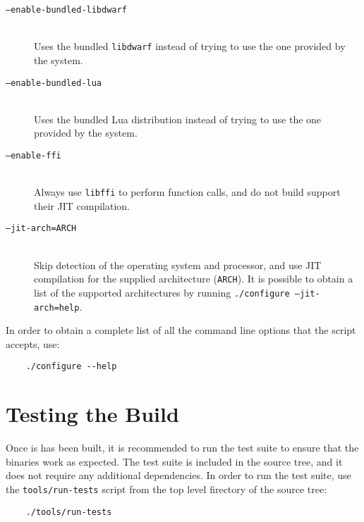 \begin{description}

	\item [\texttt{--enable-bundled-libdwarf}] \hfill\\
		Uses the bundled \verb|libdwarf| instead of trying to use the one
		provided by the system.

	\item [\texttt{--enable-bundled-lua}] \hfill\\
		Uses the bundled Lua distribution instead of trying to use the one
		provided by the system.

	\item [\texttt{--enable-ffi}] \hfill\\
		Always use \verb|libffi| to perform function calls, and do not build
		support their JIT compilation.

	\item [\texttt{--jit-arch=ARCH}] \hfill\\
		Skip detection of the operating system and processor, and use JIT
		compilation for the supplied architecture (\verb|ARCH|). It is
		possible to obtain a list of the supported architectures by running
		\texttt{./configure --jit-arch=help}.

\end{description}

In order to obtain a complete list of all the command line options that the
script accepts, use:

\begin{verbatim}
	./configure --help
\end{verbatim}


\section{Testing the Build}

Once \Eol* is has been built, it is recommended to run the test suite to
ensure that the binaries work as expected. The test suite is included in the
source tree, and it does not require any additional dependencies. In order
to run the test suite, use the \verb|tools/run-tests| script from the
top level firectory of the source tree:

\begin{verbatim}
	./tools/run-tests
\end{verbatim}

\beforeintro
